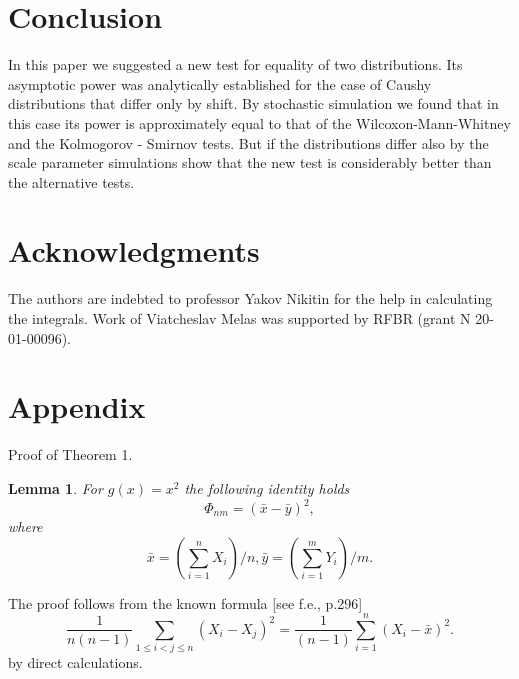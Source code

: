 \documentclass[final,11pt,3p]{elsarticle}
\newtheorem{lemma}{Lemma}
\begin{document}
\section{Conclusion}
In this paper we suggested a new test for equality of two distributions. Its asymptotic power was analytically established for the case of Caushy distributions that differ only by shift. By stochastic simulation we found that in this case its power is approximately equal to that of the Wilcoxon-Mann-Whitney and the
Kolmogorov - Smirnov tests. But if the distributions differ also by the scale parameter simulations show that the new test is considerably better than the alternative tests.

\section*{Acknowledgments}
The authors are indebted to professor
 Yakov Nikitin for the help in calculating the  integrals. Work of Viatcheslav Melas was supported by RFBR (grant N 20-01-00096).

\section{Appendix}
Proof of Theorem 1.
\begin{lemma} For $g(x)= x^2$ the following identity holds
$$
\Phi_{nm}= (\bar x - \bar y)^2,
$$
where
$$
\bar x = (\sum_{i=1}^n X_i)/n,
\bar y = (\sum_{i=1}^m Y_i)/m.
$$
\end{lemma}

The proof follows from the known formula [see f.e.\cite{Hoeffding}, p.296]
$$
\frac {1}{n(n-1)}\sum_{1\leq i<j\leq n
} (X_i-X_j)^2=\frac {1}{(n-1)} \sum_{i=1}^n (X_i - \bar x)^2.
$$
by  direct calculations.
\end{document}
